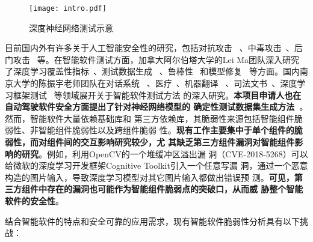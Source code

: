 \begin{figure}[htp]
    \centering
    \texttt{[image: intro.pdf]}
    \caption{深度神经网络测试示意}
    \label{fig:ch1:intro}
\end{figure}



目前国内外有许多关于人工智能安全性的研究，包括对抗攻击
~\cite{szegedy2013intriguing}、中毒攻击~\cite{zhao2020shielding}、后门攻击
~\cite{ge2021anti}等。在智能软件测试方面，加拿大阿尔伯塔大学的Lei Ma团队深入研究
了深度学习覆盖性指标~\cite{ma2018deepgauge,ma2019deepct}、测试数据生成
~\cite{xie2019coverage,xie2019deephunter}、鲁棒性
~\cite{wang2020deepsonar,sun2020stealthy,zhang2020generating}和模型修复
~\cite{yu2021deeprepair}等方面。国内南京大学的陈振宇老师团队在对话系统
~\cite{liu2021dialtest}、医疗~\cite{hou2021taumed}、机器翻译
~\cite{ji2021automated}、司法文书~\cite{guo2020taujud}、深度学习框架测试
~\cite{zhang2021duo,zhang2021predoo,luo2021graph}等领域展开关于智能软件测试方法
的深入研究。\textbf{本项目申请人也在自动驾驶软件安全方面提出了针对神经网络模型的
确定性测试数据集生成方法~\cite{xu2021deepsuite}}。然而，智能软件大量依赖基础库和
第三方依赖库，其脆弱性来源包括智能组件脆弱性、非智能组件脆弱性以及跨组件脆弱
性。\textbf{现有工作主要集中于单个组件的脆弱性，而对组件间的交互影响研究较少，尤
其缺乏第三方组件漏洞对智能组件影响的研究}。例如，利用OpenCV的一个堆缓冲区溢出漏
洞（CVE-2018-5268）可以给微软的深度学习开发框架Cognitive Toolkit引入一个任意写漏
洞，通过一个恶意构造的图片输入，导致深度学习模型对其它图片输入都做出错误预
测。\textbf{可见，第三方组件中存在的漏洞也可能作为智能组件脆弱点的突破口，从而威
胁整个智能软件的安全性}。


结合智能软件的特点和安全可靠的应用需求，现有智能软件脆弱性分析具有以下挑战：

